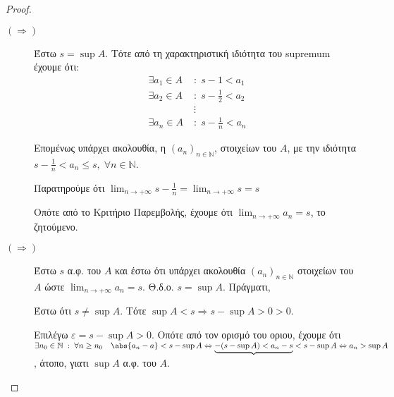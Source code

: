 \documentclass[main.tex]{subfiles}
\begin{document}

 \begin{proof}
 \item {}
     \begin{description}
         \item [$ (\Rightarrow) $]
             Έστω $ s = \sup A $. Τότε από τη χαρακτηριστική ιδιότητα του supremum έχουμε ότι:
            \begin{align*}
                \exists a_{1} \in A \; &: \; s - 1 < a_{1} \\
                \exists a_{2} \in A \; &: \; s - \frac{1}{2}  < a_{2} \\
                                       &\vdots \\
                \exists a_{n} \in A \; &: \; s - \frac{1}{n}  < a_{n} 
            \end{align*} 

            Επομένως υπάρχει ακολουθία, η $ (a_{n})_{n \in \mathbb{N}} $, στοιχείων του $A$, 
            με την ιδιότητα $ s - \frac{1}{n} < a_{n} \leq s, \; \forall n \in \mathbb{N}$. 

            Παρατηρούμε ότι $ \lim_{n \to +\infty} s- \frac{1}{n} = \lim_{n \to +\infty} s = s $ 

            Οπότε από το Κριτήριο Παρεμβολής, έχουμε ότι $ \lim_{n \to +\infty} a_{n}= s $, 
            το ζητούμενο.

        \item [$ (\Rightarrow) $]
            Έστω $ s $ α.φ. του $A$ και έστω ότι υπάρχει ακολουθία $ (a_{n})_{n \in \mathbb{N}} $ 
            στοιχείων του $A$ ώστε $ \lim_{n \to +\infty} a_{n}= s$. Θ.δ.ο. $ s = \sup A $. 
            Πράγματι, 

            Έστω ότι $ s \neq \sup A $. Τότε $ \sup A < s \Rightarrow s - \sup A > 0 > 0 $. 

            Επιλέγω $ \varepsilon = s - \sup A >0 $. Οπότε από τον ορισμό του οριου, έχουμε ότι 
            $ \exists n_{0} \in \mathbb{N} \; : \; \forall n \geq n_{0} \quad \abs{a_{n} - a} < 
            s - \sup A \Leftrightarrow \underbrace{-(s - \sup A) < a_{n} - s} < s - \sup A 
            \Leftrightarrow a_{n} > \sup A$, άτοπο, γιατι $ \sup A $ α.φ. του $A$.
     \end{description}
 \end{proof}
\end{document}
